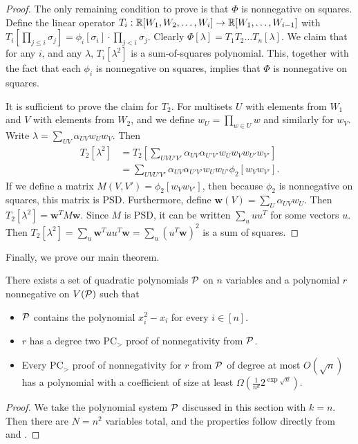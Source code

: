 \begin{proof}
The only remaining condition to prove is that $\Phi$ is nonnegative on squares. Define the linear operator $T_i: \mathbb R[W_1, W_2,\dots,W_i] \rightarrow \mathbb R[W_1,\dots,W_{i-1}]$ with $T_i[\prod_{j\leq i} \sigma_j] = \phi_i[\sigma_i] \cdot \prod_{j < i} \sigma_j$. Clearly $\Phi[\lambda] = T_1T_2\dots T_n[\lambda]$. We claim that for any $i$, and any $\lambda$, $T_i[\lambda^2]$ is a sum-of-squares polynomial. This, together with the fact that each $\phi_i$ is nonnegative on squares, implies that $\Phi$ is nonnegative on squares.

It is sufficient to prove the claim for $T_2$. For multisets $U$ with elements from $W_1$ and $V$ with elements from $W_2$, and we define $w_U = \prod_{w \in U} w$ and similarly for $w_V$. Write $\lambda = \sum_{UV} \alpha_{UV}w_Uw_V$. Then
\begin{align*}
T_2[\lambda^2] &= T_2[\sum_{UVU'V'} \alpha_{UV}\alpha_{U'V'} w_Uw_Vw_{U'}w_{V'}] \\
&= \sum_{UVU'V'} \alpha_{UV}\alpha_{U'V'}w_{U}w_{U'}\phi_2[w_Vw_{V'}].
\end{align*}
If we define a matrix $M(V,V') = \phi_2[w_Vw_{V'}]$, then because $\phi_2$ is nonnegative on squares, this matrix is PSD. Furthermore, define $\mathbf{w}(V) = \sum_U \alpha_{UV}w_U$. Then $T_2[\lambda^2] = \mathbf{w}^TM\mathbf{w}$. Since $M$ is PSD, it can be written $\sum_u uu^T$ for some vectors $u$. Then $T_2[\lambda^2] = \sum_u \mathbf{w}^Tuu^T\mathbf{w} = \sum_u (u^T\mathbf{w})^2$ is a sum of squares. 
\end{proof}

Finally, we prove our main theorem.
\begin{theorem}
There exists a set of quadratic polynomials $\mathcal P$ on $n$ variables and a polynomial $r$ nonnegative on $V(\mathcal P)$ such that
\begin{itemize}
\item $\mathcal P$ contains the polynomial $x_i^2 - x_i$ for every $i \in [n]$.
\item $r$ has a degree two PC$_>$ proof of nonnegativity from $\mathcal P$. 
\item Every PC$_>$ proof of nonnegativity for $r$ from $\mathcal P$ of degree at most $O(\sqrt{n})$ has a polynomial with a coefficient of size at least $\Omega(\frac{1}{n^d}2^{\exp \sqrt{n}})$.
\end{itemize}
\end{theorem}
\begin{proof}
We take the polynomial system $\mathcal P$ discussed in this section with $k = n$. Then there are $N = n^2$ variables total, and the properties follow directly from  and .
\end{proof}